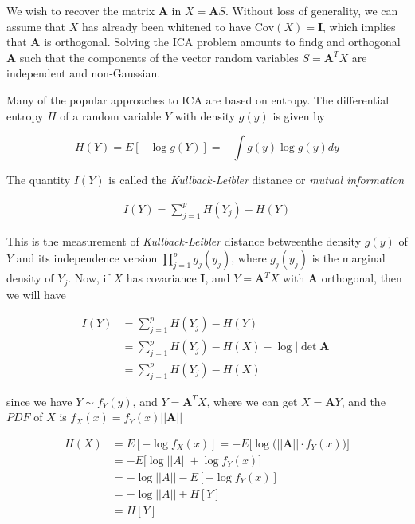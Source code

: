 \documentclass{article}
\begin{document}
We wish to recover the matrix $\pmb A$ in $X = \pmb A S$. Without loss of generality, we can assume that $X$ has already been whitened to have $\text{Cov}(X) = \mathbf I$, which implies that $\pmb A$ is orthogonal. Solving the ICA problem amounts to findg and orthogonal $\pmb A$ such that the components of the vector random variables $S = \pmb A^T X$ are independent and non-Gaussian.

Many of the popular approaches to ICA are based on entropy. The differential entropy $H$ of a random variable $Y$ with density $g(y)$ is given by

\begin{equation}
	H(Y) = E[-\log g(Y)] = -\int g(y)\log g(y) dy
\end{equation}

The quantity $I(Y)$ is called the \textit{Kullback-Leibler} distance or \textit{mutual information}

\begin{equation}
\begin{aligned}
		I(Y) = \sum_{j=1}^p H(Y_j) - H(Y)
\end{aligned}
\end{equation}


This is the measurement of \textit{Kullback-Leibler} distance betweenthe density $g(y)$ of $Y$ and its independence version $\prod_{j=1}^p g_j(y_j)$, where $g_j(y_j)$ is the marginal density of $Y_j$. Now, if $X$ has covariance $\mathbf I$, and $Y = \pmb A^T X$ with $\pmb A$ orthogonal, then we will have

\begin{align}
	I(Y) & = \sum_{j=1}^p H(Y_j) - H(Y) \\
	& = \sum_{j=1}^p H(Y_j) - H(X) - \log |\det \pmb A|\\
	& = \sum_{j=1}^p H(Y_j) - H(X)
\end{align}

since we have $Y \sim f_Y(y)$, and $Y = \pmb A^T X$, where we can get $X = \pmb A Y$, and the $PDF$ of $X$ is $f_X(x) = f_Y(x)||\pmb A||$

\begin{align}
	H(X) & = E[-\log f_X(x)] = -E\bigg[ \log \big(||\pmb A|| \cdot f_Y(x)\big) \bigg]\\
	& = - E\bigg[ \log ||A|| + \log f_Y(x) \bigg] \\
	& = -\log||A|| - E[-\log f_Y(x)]\\
	& = -\log||A|| + H[Y]\\
	& = H[Y]
\end{align}
\end{document}
